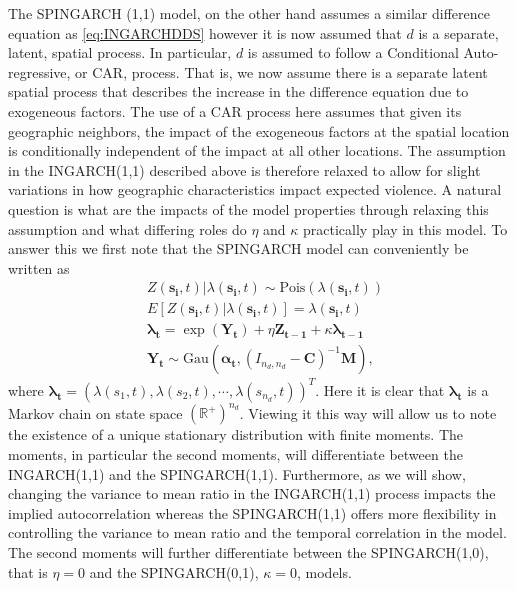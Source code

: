 \documentclass[11pt]{isuthesis}
\begin{document}
The SPINGARCH (1,1) model, on the other hand assumes a similar difference equation as \eqref{eq:INGARCHDDS} however it is now assumed that $d$ is a separate, latent, spatial process.  In particular, $d$ is assumed to follow a Conditional Auto-regressive, or CAR, process.  That is, we now assume there is a separate latent spatial process that describes the increase in the difference equation due to exogeneous factors. The use of a CAR process here assumes that given its geographic neighbors, the impact of the exogeneous factors at the spatial location is conditionally independent of the impact at all other locations.  The assumption in the INGARCH(1,1) described above is therefore relaxed to allow for slight variations in how geographic characteristics impact expected violence.  A natural question is what are the impacts of the model properties through relaxing this assumption and what differing roles do $\eta$ and $\kappa$ practically play in this model.  To answer this we first note that the SPINGARCH model can conveniently be written as
\begin{align}
	& Z(\boldsymbol{s_i},t)|\lambda(\boldsymbol{s_i},t) \sim \mbox{Pois}(\lambda(\boldsymbol{s_i},t)) \label{eq:timeseries2} \\
	& E[Z(\boldsymbol{s_i},t)|\lambda(\boldsymbol{s_i},t)]=\lambda(\boldsymbol{s_i},t)\\
	& \boldsymbol{\lambda_t} = \exp(\boldsymbol{Y_t})+\eta \boldsymbol{Z_{t-1}}+\kappa \boldsymbol{\lambda_{t-1}}\\
	& \boldsymbol{Y_t} \sim \mbox{Gau}\textit{} (\boldsymbol{\alpha_t},(I_{{n_d},{n_d}}-\boldsymbol{C})^{-1}\boldsymbol{M}),
\end{align}
where $\boldsymbol{\lambda_t}=\left(\lambda(s_1,t),\lambda(s_2,t),\cdots,\lambda(s_{n_d},t)\right)^T$.  Here it is clear that $\boldsymbol{\lambda_t}$ is a Markov chain on state space $(\mathbb{R}^{+})^{n_d}$.  Viewing it this way will allow us to note the existence of a unique stationary distribution with finite moments.  The moments, in particular the second moments, will differentiate between the INGARCH(1,1) and the SPINGARCH(1,1).  Furthermore, as we will show, changing the variance to mean ratio in the INGARCH(1,1) process impacts the implied autocorrelation whereas the SPINGARCH(1,1) offers more flexibility in controlling the variance to mean ratio and the temporal correlation in the model.  The second moments will further differentiate between the SPINGARCH(1,0), that is $\eta=0$ and the SPINGARCH(0,1), $\kappa=0$, models.  
\end{document}
